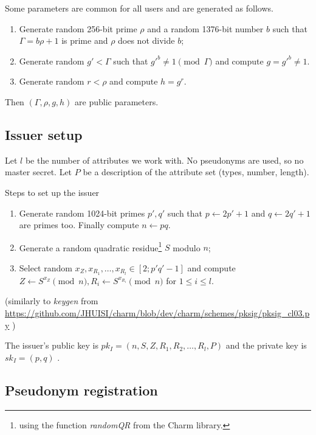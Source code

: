 \documentclass[a4paper]{article}
\begin{document}
Some parameters are common for all users and are generated as follows.
\begin{enumerate}
\item Generate random 256-bit prime $\rho$ and a random 1376-bit number $b$ such that
$\Gamma = b\rho+1$ is prime and $\rho$ does not divide $b$;
\item Generate random $g'< \Gamma$ such that
$g'^{b}\neq 1\pmod{\Gamma}$ and compute $g = g'^{b}\neq 1$.
\item Generate random $r<\rho$ and compute $h = g^r$.
\end{enumerate}
Then $(\Gamma,\rho,g,h)$ are public parameters.

\subsection{Issuer setup}\label{sec:iss-setup}

Let $l$ be the number of attributes we work with. No pseudonyms are used, so no master secret. Let $P$ be a description of the 
attribute set (types, number, length).


Steps to set up the issuer
\begin{enumerate}
\item Generate random 1024-bit primes $p',q'$ such that  $p \leftarrow 2p'+1$ and $q \leftarrow 2q'+1$ are primes too. Finally compute $n \leftarrow pq$.
    \item Generate a random quadratic residue\footnote{using the function \textsl{randomQR} from the Charm library.} $S$ modulo $n$;
    \item Select random $x_Z, x_{R_1},\ldots , x_{R_l}\in [2; p'q'-1]$ and
compute $Z \leftarrow S^{x_Z}\pmod{n} , R_i \leftarrow S^{x_{R_i}}\pmod{n}$ for $1\leq i \leq l$.
\end{enumerate}
(similarly  to \textsl{keygen} from \url{https://github.com/JHUISI/charm/blob/dev/charm/schemes/pksig/pksig_cl03.py} )

The issuer's public key is $pk_I = (n, S,Z,R_1,R_2,\ldots,R_l,P)$ and the private key is $sk_I = (p, q)$ .

\subsection{Pseudonym registration}
\end{document}
